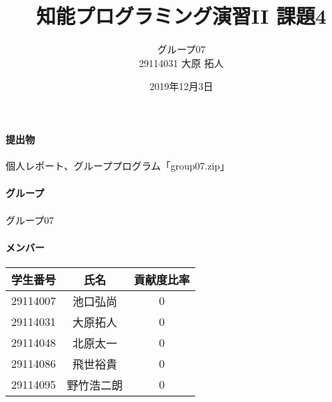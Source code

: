 \documentclass{jarticle}
\title{知能プログラミング演習II 課題4}
\author{グループ07\\
    29114031 大原 拓人\\
}
\date{2019年12月3日}
\begin{document}
\maketitle

\paragraph{提出物} 個人レポート、グループプログラム「group07.zip」
\paragraph{グループ} グループ07
\paragraph{メンバー}
\begin{tabular}{|c|c|c|}
    \hline
    学生番号&氏名&貢献度比率\\
    \hline\hline
    29114007&池口弘尚&0\\
    \hline
    29114031&大原拓人&0\\
    \hline
    29114048&北原太一&0\\
    \hline
    29114086&飛世裕貴&0\\
    \hline
    29114095&野竹浩二朗&0\\
    \hline
\end{tabular}
\end{document}
